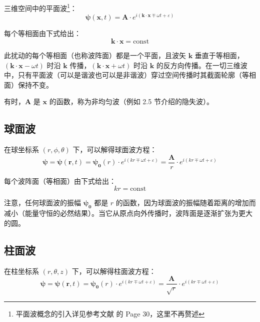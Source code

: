 \documentclass[UTF8]{report}
\theoremstyle{MyLineTheoremStyle} %
\theoremstyle{MyBlockTheoremStyle} %
\theoremstyle{MySubsubsectionStyle} %
\begin{document}
三维空间中的平面波\footnote{平面波概念的引入详见参考文献 \cite{Optics} 的 Page 30，这里不再赘述}：
\begin{equation}
\boldsymbol{\psi}(\boldsymbol{x}, t) = \boldsymbol{A}\cdot e^{i(\boldsymbol{k}\cdot \boldsymbol{x} \mp \omega t + \varepsilon)}
\end{equation}

每个等相面由下式给出：
\begin{equation}
    \boldsymbol{k} \cdot \boldsymbol{x} = \text{const}
\end{equation}

此扰动的每个等相面（也称波阵面）都是一个平面，且波矢 $\boldsymbol{k}$ 垂直于等相面，$(\boldsymbol{k}\cdot \boldsymbol{x} - \omega t)$ 时沿 $\boldsymbol{k}$ 传播，$(\boldsymbol{k}\cdot \boldsymbol{x} + \omega t)$ 时沿 $\boldsymbol{k}$ 的反方向传播。在一切三维波中，只有平面波（可以是谐波也可以是非谐波）穿过空间传播时其截面轮廓（等相面）保持不变。

有时，$\boldsymbol{A}$ 是 $\boldsymbol{x}$ 的函数，称为非均匀波（例如 2.5 节介绍的隐失波）。

\subsection{球面波}

在球坐标系 $(r, \phi, \theta)$ 下，可以解得球面波方程：
\begin{equation}
\boldsymbol{\psi} = \boldsymbol{\psi}(\boldsymbol{r}, t) = \boldsymbol{\psi_{0}}(r) \cdot e^{i\left( k r \mp  \omega t + \varepsilon \right)} =  \frac{\boldsymbol{A}}{r}\cdot e^{i\left( k r \mp  \omega t + \varepsilon \right)}
\end{equation}

每个波阵面（等相面）由下式给出：
\begin{equation}
kr = \text{const}
\end{equation}

注意，任何球面波的振幅 $\boldsymbol{\psi_0}$ 都是 $r$ 的函数，因为球面波的振幅随着距离的增加而减小（能量守恒的必然结果）。当它从原点向外传播时，波阵面是逐渐扩张为更大的圆。

\subsection{柱面波}

在柱坐标系 $(r, \theta, z)$ 下，可以解得柱面波方程：
\begin{equation}
\boldsymbol{\psi} = \boldsymbol{\psi}(\boldsymbol{r}, t) = \boldsymbol{\psi_{0}}(r) \cdot e^{i\left( k r \mp  \omega t + \varepsilon \right)} = \frac{\boldsymbol{A}}{\sqrt{r}}\cdot e^{i\left( kr \mp  \omega t + \varepsilon \right)}
\end{equation}
\end{document}
